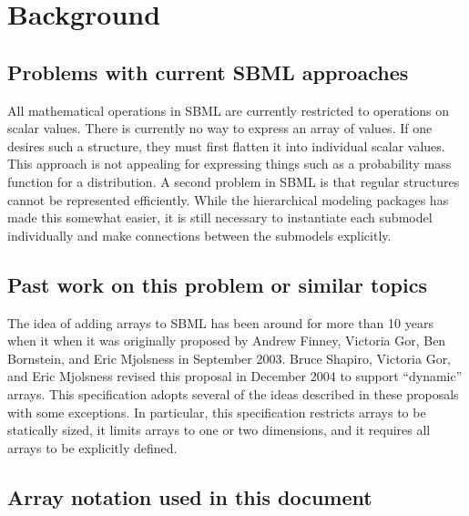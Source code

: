 
\section{ Background }
\label{background}

\subsection{ Problems with current SBML approaches }

All mathematical operations in SBML are currently restricted to operations on scalar values.  There is currently no way to express an array of values.  If one desires such a structure, they must first flatten it into individual scalar values.  This approach is not appealing for expressing things such as a probability mass function for a distribution.  A second problem in SBML is that regular structures cannot be represented efficiently.  While the hierarchical modeling packages has made this somewhat easier, it is still necessary to instantiate each submodel individually and make connections between the submodels explicitly.  

\subsection{ Past work on this problem or similar topics }

The idea of adding arrays to SBML has been around for more than 10 years when it when it was originally proposed by Andrew Finney, Victoria Gor, Ben Bornstein, and Eric Mjolsness in September 2003.   Bruce Shapiro, Victoria Gor, and Eric Mjolsness revised this proposal in December 2004 to support ``dynamic'' arrays.  This specification adopts several of the ideas described in these proposals with some exceptions.  In particular, this specification restricts arrays to be statically sized, it limits arrays to one or two dimensions, and it requires all arrays to be explicitly defined.  

\subsection{Array notation used in this document}

